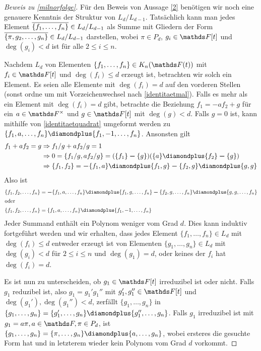 \documentclass[ngerman,fontsize=11pt, paper=a4, parskip=half, titlepage=true, toc=bib]{scrartcl}
\begin{document}
\begin{proof}[Beweis zu \ref{milnorfolge}]
  Für den Beweis von Aussage \eqref{2} benötigen wir noch eine genauere
  Kenntnis der Struktur von $L_d/L_{d-1}$.
  Tatsächlich kann man jedes Element 
  $\overline{\{f_1,\dotsc,f_n\}}\in L_d/L_{d-1}$ als Summe
  mit Gliedern der Form  $\overline{\{\pi,g_2,\dotsc,g_n\}}\in L_d/L_{d-1}$
  darstellen, wobei $\pi\in P_d$, $g_i\in\F[t]$ 
  und $\deg(g_i)<d$ ist für alle $2\leq i\leq n$.
  
  Nachdem $L_d$ von Elementen $\{f_1,\dotsc,f_n\}\in\KnFt$ mit
  $f_i\in\F[t]$ und $\deg(f_i)\leq d$ erzeugt ist, 
  betrachten wir solch ein Element.
  Es seien alle Elemente mit $\deg(f_i)=d$ auf den vorderen Stellen 
  (sonst ordne um mit Vorzeichenwechsel nach \ref{identitaetmal}).
  Falls es mehr als ein Element mit $\deg(f_i)=d$ gibt, betrachte
  die Beziehung $f_1=-af_2+g$ für ein $a\in\Fx$ und $g\in\F[t]$ mit $\deg(g)<d$.
  Falls $g=0$ ist, kann mithilfe von \ref{identitaetquadrat}
  umgeformt werden zu $\{f_1,a,\dotsc,f_n\}\p\{f_1,-1,\dotsc,f_n\}$.
  Ansonsten gilt
  \begin{align*}
    f_1+af_2=g 
    &\Rightarrow f_1/g+af_2/g=1\\
    &\Rightarrow 0=\{f_1/g,af_2/g\}=(\{f_1\}\m\{g\})(\{a\}\p\{f_2\}\m\{g\})\\
    &\Rightarrow \{f_1,f_2\}=\m\{f_1,a\}\p\{f_1,g\}\m\{f_2,g\}\p\{g,g\}
  \end{align*}
  Also ist 
  \begin{align*}
    \{f_1,f_2,\dotsc,f_n\} 
    &=\m \{f_1,a,\dotsc,f_n\}
      \p \{f_1,g,\dotsc,f_n\}
      \m \{f_2,g,\dotsc,f_n\}
      \p \{g,g,\dotsc,f_n\}\\
    \intertext{oder}
    \{f_1,f_2,\dotsc,f_n\} 
    &=\{f_1,a,\dotsc,f_n\}\p\{f_1,-1,\dotsc,f_n\}
  \end{align*}
  Jeder Summand enthält ein Polynom weniger vom Grad $d$.
  Dies kann induktiv fortgeführt werden und wir erhalten,
  dass jedes Element $\{f_1,\dotsc,f_n\}\in L_d$ mit $\deg(f_i)\leq d$
  entweder erzeugt ist von Elementen $\{g_1,\dotsc, g_n\}\in L_d$ mit
  $\deg(g_i)<d$ für $2\leq i\leq n$ und $\deg(g_1)=d$,
  oder keines der $f_i$ hat $\deg(f_i)=d$.
  
  Es ist nun zu unterscheiden, ob $g_1\in\F[t]$ irreduzibel ist oder
  nicht. Falls $g_1$ reduzibel ist, also $g_1=g_1'g_1''$ mit
  $g_1',g_1''\in\F[t]$ und $\deg(g_1'),\deg(g_1'')<d$,
  zerfällt $\{g_1,\dotsc,g_n\}$ in 
  $\{g_1,\dotsc,g_n\}=\{g_1',\dotsc,g_n\}\p\{g_1'',\dotsc,g_n\}$.
  Falls $g_1$ irreduzibel ist mit $g_1=a\pi, a\in\F, \pi\in P_d$, 
  ist $\{g_1,\dotsc,g_n\}=\{\pi,\dotsc,g_n\}\p\{a,\dotsc,g_n\}$,
  wobei ersteres die gesuchte Form hat und in letzterem wieder kein
  Polynom vom Grad $d$ vorkommt.


\end{proof}
\end{document}

